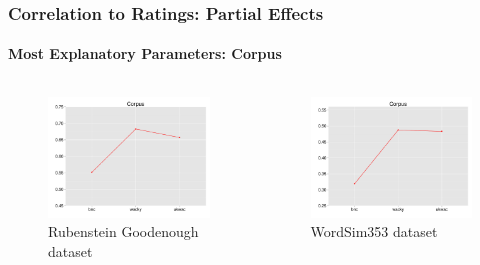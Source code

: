 \documentclass[t]{beamer} %
\begin{document}
\begin{frame}
  \frametitle{Correlation to Ratings: Partial Effects}
  \framesubtitle{Most Explanatory Parameters:  Corpus} 
  
  \vspace{-18pt}
  
  \begin{columns}
    
    \begin{column}{0.5\textwidth}
      \begin{figure} 
        \hspace*{-18pt} 
        \includegraphics[scale=0.30]{img/lapesa_rg_main_corpus}
        \vspace{-10pt}
        \caption{Rubenstein Goodenough dataset}
      \end{figure}
    \end{column}


    \begin{column}{0.5\textwidth}
      \centering
      
      \begin{figure}
        \hspace*{-18pt}   
        \includegraphics[scale=0.30]{img/lapesa_ws_main_corpus}
        \vspace{-10pt}
        \caption{WordSim353 dataset}
      \end{figure}
      

\end{column}
\end{columns}
\end{frame}
\end{document}
